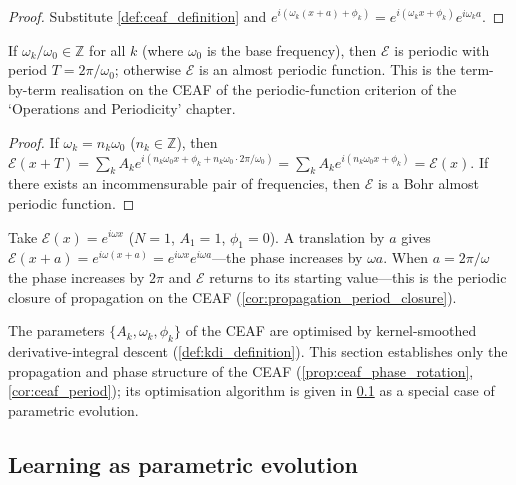 \begin{proof}
Substitute \cref{def:ceaf_definition} and $e^{i(\omega_k(x+a)+\phi_k)} = e^{i(\omega_k x+\phi_k)}e^{i\omega_k a}$.
\end{proof}

\begin{corollary}\label{cor:ceaf_period}
If $\omega_k/\omega_0\in\mathbb{Z}$ for all $k$ (where $\omega_0$ is the base frequency), then $\mathcal{E}$ is periodic with period $T = 2\pi/\omega_0$; otherwise $\mathcal{E}$ is an almost periodic function. This is the term-by-term realisation on the CEAF of the periodic-function criterion of the `Operations and Periodicity' chapter.
\end{corollary}

\begin{proof}
If $\omega_k = n_k\omega_0$ ($n_k\in\mathbb{Z}$), then $\mathcal{E}(x+T) = \sum_k A_k e^{i(n_k\omega_0 x+\phi_k+n_k\omega_0\cdot 2\pi/\omega_0)} = \sum_k A_k e^{i(n_k\omega_0 x+\phi_k)} = \mathcal{E}(x)$. If there exists an incommensurable pair of frequencies, then $\mathcal{E}$ is a Bohr almost periodic function.
\end{proof}

\begin{example}\label{ex:single_ceaf_phase}
Take $\mathcal{E}(x) = e^{i\omega x}$ ($N=1$, $A_1=1$, $\phi_1=0$). A translation by $a$ gives $\mathcal{E}(x+a) = e^{i\omega(x+a)} = e^{i\omega x}e^{i\omega a}$---the phase increases by $\omega a$. When $a = 2\pi/\omega$ the phase increases by $2\pi$ and $\mathcal{E}$ returns to its starting value---this is the periodic closure of propagation on the CEAF (\cref{cor:propagation_period_closure}).
\end{example}

\begin{remark}\label{rem:ceaf_kdi_interface}
The parameters $\{A_k,\omega_k,\phi_k\}$ of the CEAF are optimised by kernel-smoothed derivative-integral descent (\cref{def:kdi_definition}). This section establishes only the propagation and phase structure of the CEAF (\cref{prop:ceaf_phase_rotation}, \cref{cor:ceaf_period}); its optimisation algorithm is given in \cref{subsec:parametric_evolution} as a special case of parametric evolution.
\end{remark}

\subsection{Learning as parametric evolution}\label{subsec:parametric_evolution}

